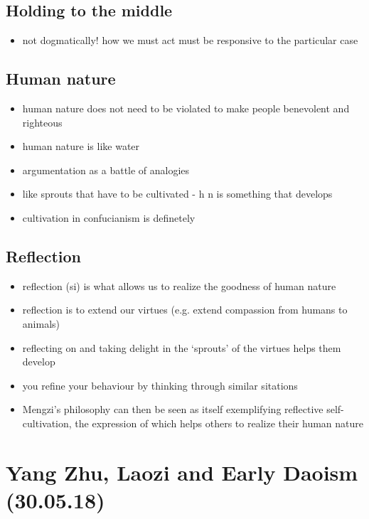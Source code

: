 \documentclass[emulatestandardclasses]{scrartcl}
\begin{document}
\subsection{Holding to the middle}

\begin{itemize}
  \item not dogmatically! how we must act must be responsive to the particular case
\end{itemize}


\subsection{Human nature}

\begin{itemize}
  \item human nature does not need to be violated to make people benevolent and righteous
  \item human nature is like water
  \item argumentation as a battle of analogies
  \item like sprouts that have to be cultivated - h n is something that develops
  \item cultivation in confucianism is definetely 
\end{itemize}



\subsection{Reflection}

\begin{itemize}
  \item reflection (si) is what allows us to realize the goodness of human nature
  \item reflection is to extend our virtues (e.g. extend compassion from humans to animals)
  \item reflecting on and taking delight in the ‘sprouts’ of the virtues helps them develop
  \item you refine your behaviour by thinking through similar sitations
  \item Mengzi’s philosophy can then be seen as itself exemplifying reflective self-cultivation, the expression of which helps others to realize their human nature
\end{itemize}


\section{Yang Zhu, Laozi and Early Daoism\\(30.05.18)}
\end{document}
